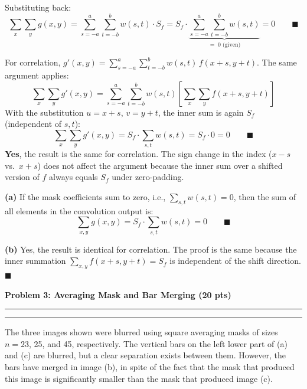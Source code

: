 \documentclass[12pt]{article}
\newcommand{\question}[1]{%
  \clearpage
  \vspace{0.5cm}
  {\noindent\normalsize \textbf{#1}}
  \vspace{0.2cm}
  \hrule
  \vspace{0.1cm}
  \hrule
  \vspace{0.3cm}
}
\begin{document}
\begin{stepbox}
Substituting back:
\[
\sum_x \sum_y g(x,y) = \sum_{s=-a}^{a} \sum_{t=-b}^{b} w(s,t) \cdot S_f = S_f \cdot \underbrace{\sum_{s=-a}^{a} \sum_{t=-b}^{b} w(s,t)}_{= \; 0 \text{ (given)}} = 0 \qquad \blacksquare
\]
\end{stepbox}

\begin{stepbox}
For correlation, $g'(x,y) = \displaystyle\sum_{s=-a}^{a}\sum_{t=-b}^{b} w(s,t)\, f(x+s, y+t)$. The same argument applies:
\[
\sum_x \sum_y g'(x,y) = \sum_{s=-a}^{a}\sum_{t=-b}^{b} w(s,t) \left[\sum_x \sum_y f(x+s, y+t)\right]
\]
With the substitution $u = x+s$, $v = y+t$, the inner sum is again $S_f$ (independent of $s,t$):
\[
\sum_x \sum_y g'(x,y) = S_f \cdot \sum_{s,t} w(s,t) = S_f \cdot 0 = 0 \qquad \blacksquare
\]
\textbf{Yes}, the result is the same for correlation. The sign change in the index ($x-s$ vs.\ $x+s$) does not affect the argument because the inner sum over a shifted version of $f$ always equals $S_f$ under zero-padding.
\end{stepbox}

\begin{resultsbox}
\textbf{(a)} If the mask coefficients sum to zero, i.e., $\sum_{s,t} w(s,t) = 0$, then the sum of all elements in the convolution output is:
\[
\sum_{x,y} g(x,y) = S_f \cdot \sum_{s,t} w(s,t) = 0 \qquad \blacksquare
\]

\textbf{(b)} Yes, the result is identical for correlation. The proof is the same because the inner summation $\sum_{x,y} f(x+s, y+t) = S_f$ is independent of the shift direction. $\blacksquare$
\end{resultsbox}



\question{Problem 3: Averaging Mask and Bar Merging (20 pts)}\label{quest:3}

The three images shown were blurred using square averaging masks of sizes $n=23$, 25, and 45, respectively. The vertical bars on the left lower part of (a) and (c) are blurred, but a clear separation exists between them. However, the bars have merged in image (b), in spite of the fact that the mask that produced this image is significantly smaller than the mask that produced image (c).
\end{document}
